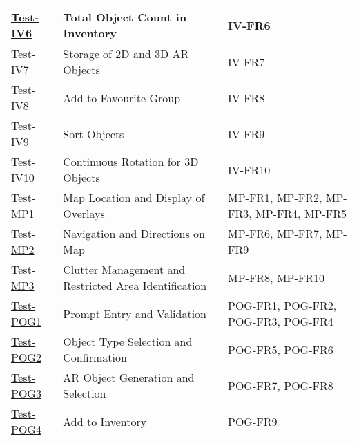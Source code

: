 \documentclass[12pt, titlepage]{article}
\begin{document}
\begin{table}[htpb!]
  \centering
  \begin{tabular}{|l|p{8cm}|p{3cm}|}
    \hline
    \hyperref[itm:Test-IV6]{Test-IV6}   & Total Object Count in Inventory                       & IV-FR6                                                          \\
    \hline
    \hyperref[itm:Test-IV7]{Test-IV7}   & Storage of 2D and 3D AR Objects                       & IV-FR7                                                          \\
    \hline
    \hyperref[itm:Test-IV8]{Test-IV8}   & Add to Favourite Group                                & IV-FR8                                                          \\
    \hline
    \hyperref[itm:Test-IV9]{Test-IV9}   & Sort Objects                                          & IV-FR9                                                          \\
    \hline
    \hyperref[itm:Test-IV10]{Test-IV10} & Continuous Rotation for 3D Objects                    & IV-FR10                                                         \\
    \hline
    \hyperref[itm:Test-MP1]{Test-MP1}   & Map Location and Display of Overlays                  & MP-FR1, MP-FR2, MP-FR3, MP-FR4, MP-FR5                          \\
    \hline
    \hyperref[itm:Test-MP2]{Test-MP2}   & Navigation and Directions on Map                      & MP-FR6, MP-FR7, MP-FR9                                          \\
    \hline
    \hyperref[itm:Test-MP3]{Test-MP3}   & Clutter Management and Restricted Area Identification & MP-FR8, MP-FR10                                                 \\
    \hline
    \hyperref[itm:Test-POG1]{Test-POG1} & Prompt Entry and Validation                           & POG-FR1, POG-FR2, POG-FR3, POG-FR4                              \\
    \hline
    \hyperref[itm:Test-POG2]{Test-POG2} & Object Type Selection and Confirmation                & POG-FR5, POG-FR6                                                \\
    \hline
    \hyperref[itm:Test-POG3]{Test-POG3} & AR Object Generation and Selection                    & POG-FR7, POG-FR8                                                \\
    \hline
    \hyperref[itm:Test-POG4]{Test-POG4} & Add to Inventory                                      & POG-FR9                                                         \\

\end{tabular}
\end{table}
\end{document}
